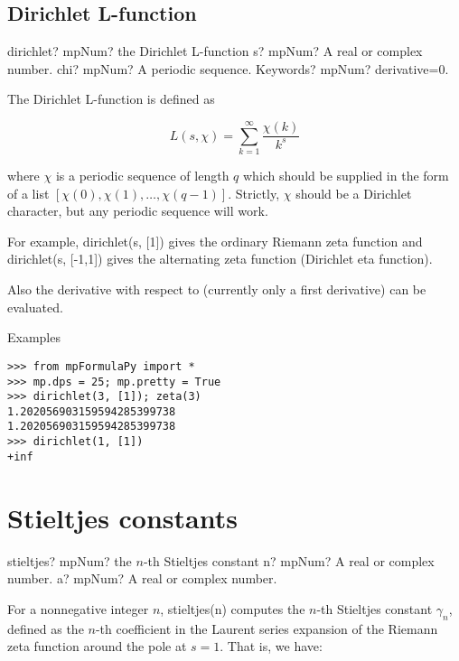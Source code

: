 \subsection{Dirichlet L-function}

\begin{mpFunctionsExtract}
	\mpFunctionThree
	{dirichlet? mpNum? the Dirichlet L-function}
	{s? mpNum? A real or complex number.}
	{chi? mpNum? A periodic sequence.}	
	{Keywords? mpNum? derivative=0.}	
\end{mpFunctionsExtract}

\vpara
The Dirichlet L-function is defined as

\begin{equation}
L(s,\chi)=\sum_{k=1}^{\infty} \frac{\chi(k)}{k^s}
\end{equation}

where $\chi$ is a periodic sequence of length $q$ which should be supplied in the form of a list $[\chi(0), \chi(1),\ldots,\chi(q-1)]$. Strictly, $\chi$ should be a Dirichlet character, but any periodic sequence will work.

\vpara
For example, dirichlet(s, [1]) gives the ordinary Riemann zeta function and dirichlet(s, [-1,1]) gives the alternating zeta function (Dirichlet eta function).

Also the derivative with respect to (currently only a first derivative) can be evaluated.

Examples

\begin{lstlisting}
>>> from mpFormulaPy import *
>>> mp.dps = 25; mp.pretty = True
>>> dirichlet(3, [1]); zeta(3)
1.202056903159594285399738
1.202056903159594285399738
>>> dirichlet(1, [1])
+inf
\end{lstlisting}


\newpage
\section{Stieltjes constants}


\begin{mpFunctionsExtract}
	\mpFunctionTwo
	{stieltjes? mpNum? the $n$-th Stieltjes constant}
	{n? mpNum? A real or complex number.}
	{a? mpNum? A real or complex number.}		
\end{mpFunctionsExtract}



For a nonnegative integer $n$, stieltjes(n) computes the $n$-th Stieltjes constant $\gamma_n$, defined as the $n$-th coefficient in the Laurent series expansion of the Riemann zeta function around the pole at $s=1$. That is, we have:

